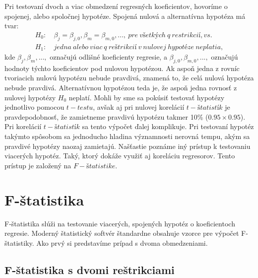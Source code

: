 \documentclass[]{tukediphc}
\begin{document}
Pri testovaní dvoch a viac obmedzení regresných koeficientov, hovoríme o spojenej, alebo spoločnej hypotéze. Spojená nulová a alternatívna hypotéza má tvar:
\begin{equation}
\begin{split}
     H_{0}: & \ \beta_j = \beta_{j,0}, \beta_m = \beta_{m,0}, ..., \ pre \ všetkých \ q \ restrikcií, vs. \ \\ H_{1}: & \ jedna \ alebo \ viac \ q \ reštrikcií \ v \ nulovej \ hypotéze \ neplatia,
\end{split}
\end{equation}
kde $\beta_j, \beta_m, ...,$ označujú odlišné koeficienty regresie, a $\beta_{j,0}, \beta_{m,0}, ...,$ označujú hodnoty týchto koeficientov pod nulovou hypotézou. Ak aspoň jedna z rovníc tvoriacich nulovú hypotézu nebude pravdivá, znamená to, že celá nulová hypotéza nebude pravdivá. Alternatívnou hypotézou teda je, že aspoň jedna rovnosť z nulovej hypotézy $H_{0}$ neplatí. 
Mohli by sme sa pokúsiť testovať hypotézy jednotlivo pomocou $t-testu$, avšak aj pri nulovej korelácií $t-štatistík$ je pravdepodobnosť, že zamietneme pravdivú hypotézu takmer 10\% ($0.95 \times 0.95$). Pri korelácií $t-štatistík$ sa tento výpočet ďalej komplikuje. Pri testovaní hypotéz takýmto spôsobom sa jednoducho hladina významnosti nerovná tempu, akým sa pravdivé hypotézy naozaj zamietajú. Našťastie poznáme iný prístup k testovaniu viacerých hypotéz. Taký, ktorý dokáže využiť aj koreláciu regresorov. Tento prístup je založený na $F-štatistike$.

\newpage
\section{F-štatistika}

F-štatistika slúži na testovanie viacerých, spojených hypotéz o koeficientoch regresie. Moderný štatistický softvér štandardne obsahuje vzorce pre výpočet F-štatistiky. Ako prvý si predstavíme prípad s dvoma obmedzeniami.

\subsection{F-štatistika s dvomi reštrikciami}
\end{document}

